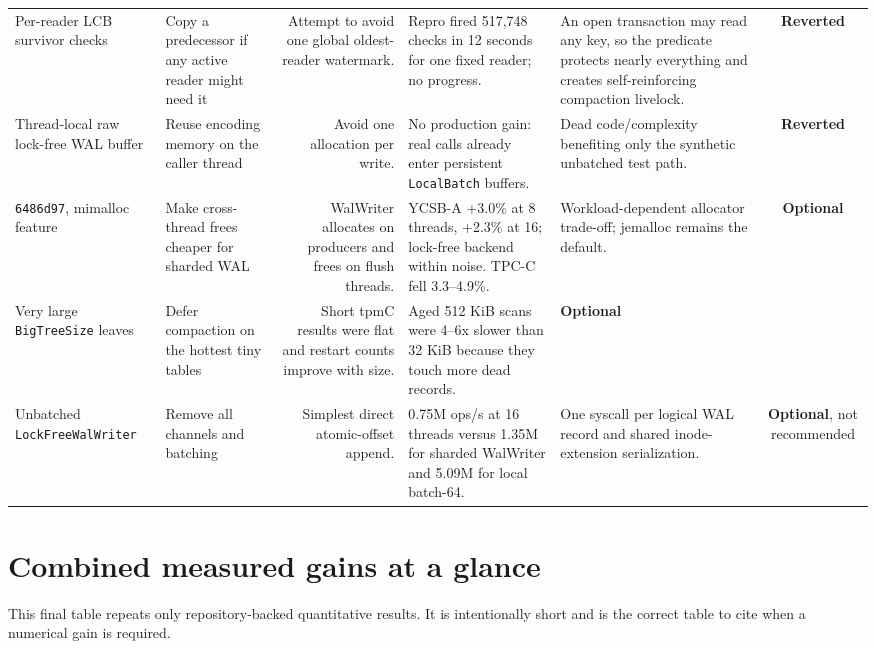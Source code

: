 \documentclass[10pt,a4paper,landscape]{article}
\newcommand{\code}[1]{\texttt{#1}}
\newcommand{\commit}[1]{\code{#1}}
\newcommand{\stateoptional}{\textbf{Optional}}
\newcommand{\statereverted}{\textbf{Reverted}}
\begin{document}
\begin{longtable}{IORGKS}
Per-reader LCB survivor checks & Copy a predecessor if any active reader might need it &
Attempt to avoid one global oldest-reader watermark. & Repro fired 517,748 checks in 12
seconds for one fixed reader; no progress. & An open transaction may read any key, so the
predicate protects nearly everything and creates self-reinforcing compaction livelock. &
\statereverted \\

Thread-local raw lock-free WAL buffer & Reuse encoding memory on the caller thread & Avoid
one allocation per write. & No production gain: real calls already enter persistent
\code{LocalBatch} buffers. & Dead code/complexity benefiting only the synthetic unbatched
test path. & \statereverted \\

\commit{6486d97}, mimalloc feature & Make cross-thread frees cheaper for sharded WAL &
WalWriter allocates on producers and frees on flush threads. & YCSB-A +3.0\% at 8 threads,
+2.3\% at 16; lock-free backend within noise. TPC-C fell 3.3--4.9\%. & Workload-dependent
allocator trade-off; jemalloc remains the default. & \stateoptional \\

Very large \code{BigTreeSize} leaves & Defer compaction on the hottest tiny tables &
Short tpmC results were flat and restart counts improve with size. & Aged 512 KiB scans
were 4--6x slower than 32 KiB because they touch more dead records. & \stateoptional \\

Unbatched \code{LockFreeWalWriter} & Remove all channels and batching & Simplest direct
atomic-offset append. & 0.75M ops/s at 16 threads versus 1.35M for sharded WalWriter and
5.09M for local batch-64. & One syscall per logical WAL record and shared inode-extension
serialization. & \stateoptional, not recommended \\
\bottomrule
\end{longtable}

\section{Combined measured gains at a glance}

This final table repeats only repository-backed quantitative results. It is intentionally
short and is the correct table to cite when a numerical gain is required.
\end{document}
